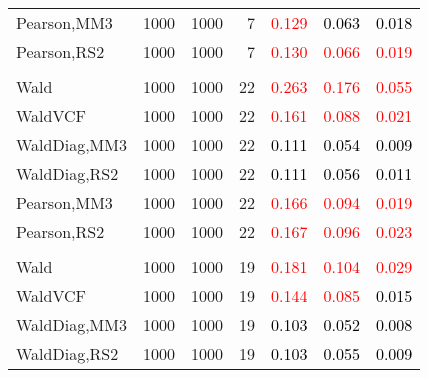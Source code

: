 \documentclass[
]{article}
\begin{document}
\begin{table}[H]
{\begin{tabular}[t]{lrrrrrr}
\hspace{1em}Pearson,MM3 & 1000 & 1000 & 7 & \textcolor{red}{0.129} & \textcolor{black}{0.063} & \textcolor{black}{0.018}\\
\hspace{1em}Pearson,RS2 & 1000 & 1000 & 7 & \textcolor{red}{0.130} & \textcolor{red}{0.066} & \textcolor{red}{0.019}\\
\addlinespace[0.3em]
\multicolumn{7}{l}{\textbf{1F 15V}}\\
\hspace{1em}Wald & 1000 & 1000 & 22 & \textcolor{red}{0.263} & \textcolor{red}{0.176} & \textcolor{red}{0.055}\\
\hspace{1em}WaldVCF & 1000 & 1000 & 22 & \textcolor{red}{0.161} & \textcolor{red}{0.088} & \textcolor{red}{0.021}\\
\hspace{1em}WaldDiag,MM3 & 1000 & 1000 & 22 & \textcolor{black}{0.111} & \textcolor{black}{0.054} & \textcolor{black}{0.009}\\
\hspace{1em}WaldDiag,RS2 & 1000 & 1000 & 22 & \textcolor{black}{0.111} & \textcolor{black}{0.056} & \textcolor{black}{0.011}\\
\hspace{1em}Pearson,MM3 & 1000 & 1000 & 22 & \textcolor{red}{0.166} & \textcolor{red}{0.094} & \textcolor{red}{0.019}\\
\hspace{1em}Pearson,RS2 & 1000 & 1000 & 22 & \textcolor{red}{0.167} & \textcolor{red}{0.096} & \textcolor{red}{0.023}\\
\addlinespace[0.3em]
\multicolumn{7}{l}{\textbf{2F 10V}}\\
\hspace{1em}Wald & 1000 & 1000 & 19 & \textcolor{red}{0.181} & \textcolor{red}{0.104} & \textcolor{red}{0.029}\\
\hspace{1em}WaldVCF & 1000 & 1000 & 19 & \textcolor{red}{0.144} & \textcolor{red}{0.085} & \textcolor{black}{0.015}\\
\hspace{1em}WaldDiag,MM3 & 1000 & 1000 & 19 & \textcolor{black}{0.103} & \textcolor{black}{0.052} & \textcolor{black}{0.008}\\
\hspace{1em}WaldDiag,RS2 & 1000 & 1000 & 19 & \textcolor{black}{0.103} & \textcolor{black}{0.055} & \textcolor{black}{0.009}\\

\end{tabular}}
\end{table}
\end{document}
